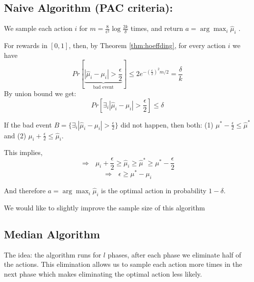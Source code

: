 \subsection{Naive Algorithm (PAC criteria):}

We sample each action $i$ for
$m=\frac{8}{\epsilon^{2}}\log\frac{2k}{\delta}$ times, and return
$a= \arg\max_{i}\hat{\mu}_{i}$ .

For rewards in $[ 0 ,1]$, then, by Theorem \ref{thm:hoeffding}, for
every action $i$ we have
\[
Pr\left[\underbrace{\left|\hat{\mu}_{i}-\mu_{i}\right|>\frac{\epsilon}{2}}_{\text{bad
event}}\right]\le 2
e^{-\left(\frac{\epsilon}{2}\right)^{2}m/2}=\frac{\delta}{k}
\]
By union bound we get:
\[
Pr\left[\exists_{i}\left|\hat{\mu}_{i}-\mu_{i}\right|>\frac{\epsilon}{2}\right]\le\delta
\]

If the bad event
$B=\{\exists_{i}\left|\hat{\mu}_{i}-\mu_{i}\right|>\frac{\epsilon}{2}\}$
did not happen, then both: (1)
$\mu^{*}-\frac{\epsilon}{2}\le\hat{\mu}^{*}$ and (2)
$\mu_{i}+\frac{\epsilon}{2}\le\hat{\mu}_{i}$.

This implies,
\[
\Rightarrow\text{ }\mu_{i}+\frac{\epsilon}{2}\ge\hat{\mu}_{i}\ge\hat{\mu}^{*}\ge\mu^{*}-\frac{\epsilon}{2}
\]
\[
\Rightarrow\text{ }\epsilon\ge\mu^{*}-\mu_{i}
\]

And therefore $a={\displaystyle \arg\max_{i}\hat{\mu}_{i}}$ is the
optimal action in probability $1-\delta$.

We would like to slightly improve the sample size of this algorithm

\subsection{Median Algorithm}

The idea: the algorithm runs for $l$ phases, after each phase we
eliminate half of the actions. This elimination allows us to sample
each action more times in the next phase which makes eliminating the
optimal action less likely.






